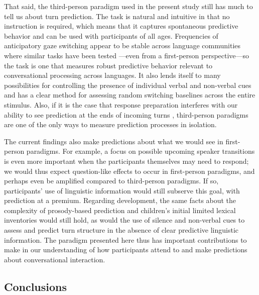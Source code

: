 \documentclass[authoryear, 12pt]{elsarticle}
\begin{document}
That said, the third-person paradigm used in the present study still has much to tell us about turn prediction. The task is natural and intuitive in that no instruction is required, which means that it captures spontaneous predictive behavior and can be used with participants of all ages. Frequencies of anticipatory gaze switching appear to be stable across language communities where similar tasks have been tested \citep{keitel2013, keitel2015, holler2015, hirvenkari2013}---even from a first-person perspective---so the task is one that measures robust predictive behavior relevant to conversational processing across languages. It also lends itself to many possibilities for controlling the presence of individual verbal and non-verbal cues and has a clear method for assessing random switching baselines across the entire stimulus. Also, if it is the case that response preparation interferes with our ability to see prediction at the ends of incoming turns \citep{levinson2016}, third-person paradigms are one of the only ways to measure prediction processes in isolation.

The current findings also make predictions about what we would see in first-person paradigms. For example, a focus on possible upcoming speaker transitions is even more important when the participants themselves may need to respond; we would thus expect question-like effects to occur in first-person paradigms, and perhaps even be amplified compared to third-person paradigms. If so, participants' use of linguistic information would still subserve this goal, with prediction at a premium. Regarding development, the same facts about the complexity of prosody-based prediction and children's initial limited lexical inventories would still hold, as would the use of silence and non-verbal cues to assess and predict turn structure in the absence of clear predictive linguistic information. The paradigm presented here thus has important contributions to make in our understanding of how participants attend to and make predictions about conversational interaction.


\subsection*{Conclusions}
\end{document}
